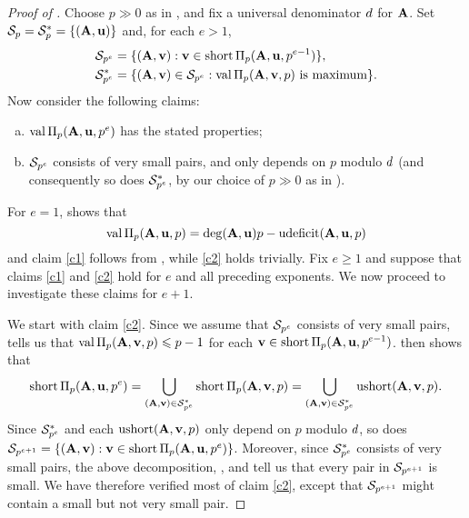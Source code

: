 \documentclass{article}
\begin{document}
\begin{proof}[Proof of ]
   Choose $p \gg 0$ as in , and fix a universal denominator $\denom$ for $\matA$.
   Set $\S_p = \S^*_p = \{ (\matA,\vv{u}) \}$ and, for each $e > 1$,
   \begin{align*}
   \S_{p^{e}} &= \{ (\matA,\vv{v}):  \vv{v} \in \short \IP_p(\matA,\vv{u},p^{e-1}) \},\\
   \S^*_{p^{e}} &= \{ (\matA,\vv{v}) \in \S_{p^{e}}:  \val\IP_p(\matA,\vv{v},p)\text{ is maximum} \}.
   \end{align*}
   Now consider the following claims:
   \begin{enumerate}[(a),leftmargin=*]
      \item\label{c1} $\val \IP_p(\matA,\vv{u},p^e)$ has the stated properties;
      \item\label{c2} $\S_{p^e}$ consists of very small pairs, and only depends on $p$ modulo $\denom$ (and consequently so does $\S^*_{p^e}$, by our choice of $p\gg 0$ as in ).
   \end{enumerate}
   For $e=1$,  shows that
   \[ \val \IP_p(\matA,\vv{u},p) = \degree(\matA,\vv{u})p-\udeficit(\matA,\vv{u},p)\]
   and claim \ref{c1} follows from , while \ref{c2} holds trivially.
   Fix $e\ge 1$ and suppose that claims \ref{c1} and \ref{c2} hold for $e$ and all preceding exponents.
   We now proceed to investigate these claims for $e+1$.

   We start with claim \ref{c2}.
   Since we assume that $\S_{p^e}$ consists of very small pairs,  tells us that $\val\IP_p(\matA,\vv{v},p) \le p-1$ for each $\vv{v} \in \short \IP_p(\matA,\vv{u},p^{e-1})$.
    then shows that
   \[\short \IP_p(\matA,\vv{u},p^{e}) = \bigcup_{(\matA,\vv{v}) \in \S^*_{p^e}} \short \IP_p(\matA,\vv{v}, p)
      = \bigcup_{(\matA,\vv{v}) \in \S^*_{p^e}} \ushort(\matA,\vv{v}, p).\]
   Since $\S^*_{p^e}$ and each $\ushort(\matA,\vv{v}, p)$ only depend on $p$ modulo $\denom$, so does $\S_{p^{e+1}} = \{(\matA,\vv{v}): \vv{v}\in \short \IP_p(\matA,\vv{u},p^{e})\}$.
   Moreover, since $\S^*_{p^e}$ consists of very small pairs, the above decomposition, , and  tell us that every pair in $\S_{p^{e+1}}$ is small.
   We have therefore verified most of claim \ref{c2}, except that $\S_{p^{e+1}}$ might contain a small but not very small pair.


\end{proof}
\end{document}
